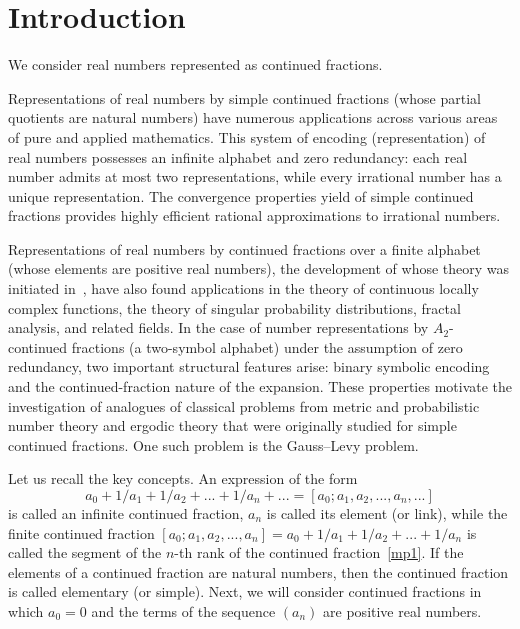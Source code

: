 \documentclass[11pt]{amsart}
\theoremstyle{plain}
\theoremstyle{remark}
\begin{document}
\maketitle

\section*{Introduction}
We consider real numbers represented as continued fractions.

Representations of real numbers by simple continued fractions (whose partial quotients are natural numbers) have numerous applications across various areas of pure and applied mathematics. This system of encoding (representation) of real numbers possesses an infinite alphabet and zero redundancy: each real number admits at most two representations, while every irrational number has a unique representation. The convergence properties yield of simple continued fractions provides highly efficient rational approximations to irrational numbers.

Representations of real numbers by continued fractions over a finite alphabet (whose elements are positive real numbers), the development of whose theory was initiated in~\cite{prats}, have also found applications in the theory of continuous locally complex functions, the theory of singular probability distributions, fractal analysis, and related fields. In the case of number representations by $A_2$-continued fractions (a two-symbol alphabet) under the assumption of zero redundancy, two important structural features arise: binary symbolic encoding and the continued-fraction nature of the expansion. These properties motivate the investigation of analogues of classical problems from metric and probabilistic number theory and ergodic theory that were originally studied for simple continued fractions. One such problem is the Gauss–Levy problem.

 Let us recall the key concepts.
An expression of the form
\begin{equation}\label{mp1}
a_0+1/a_1+1/a_2+...+1/a_n+...=[a_{0};a_{1},a_{2},...,a_{n},...]
\end{equation} is called an infinite continued fraction, $a_{n}$ is called its element (or link), while the finite continued fraction $[a_{0};a_{1},a_{2},...,a_{n}]=a_0+1/a_1+1/a_2+...+1/a_n$ is called the segment of the $n$-th rank of the continued fraction~\eqref{mp1}. If the elements of a continued fraction are natural numbers, then the continued fraction is called elementary (or simple).  Next, we will consider continued fractions in which $a_0=0$ and the terms of the sequence $(a_n)$ are positive real numbers.
\end{document}
